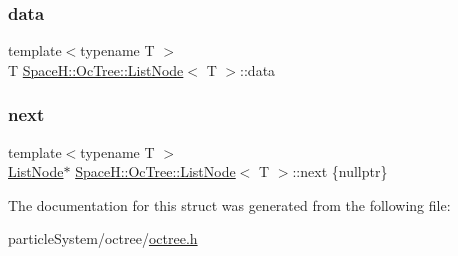 \subsubsection{\texorpdfstring{data}{data}}
{\footnotesize\ttfamily template$<$typename T $>$ \\
T \mbox{\hyperlink{struct_space_h_1_1_oc_tree_1_1_list_node}{Space\+H\+::\+Oc\+Tree\+::\+List\+Node}}$<$ T $>$\+::data}

\mbox{\label{struct_space_h_1_1_oc_tree_1_1_list_node_a6e95458aada7a0faa359bf09f07bf96b}} 
\subsubsection{\texorpdfstring{next}{next}}
{\footnotesize\ttfamily template$<$typename T $>$ \\
\mbox{\hyperlink{struct_space_h_1_1_oc_tree_1_1_list_node}{List\+Node}}$\ast$ \mbox{\hyperlink{struct_space_h_1_1_oc_tree_1_1_list_node}{Space\+H\+::\+Oc\+Tree\+::\+List\+Node}}$<$ T $>$\+::next \{nullptr\}}



The documentation for this struct was generated from the following file\+:\begin{DoxyCompactItemize}
\item 
particle\+System/octree/\mbox{\hyperlink{octree_8h}{octree.\+h}}\end{DoxyCompactItemize}
